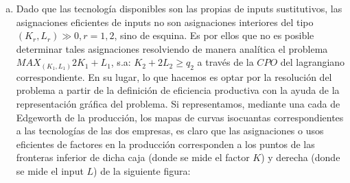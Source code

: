 \begin{enumerate}[a)]
	\item Dado que las tecnología disponibles son las propias de inputs sustitutivos, las asignaciones eficientes de inputs no son asignaciones interiores del tipo $(K_r,L_r) \gg 0, r = 1, 2$, sino de esquina. Es por ellos que no es posible determinar tales asignaciones resolviendo de manera analítica el problema $MAX_{(K_1,L_1)} 2K_1 + L_1$, s.a: $K_2 + 2 L_2 \geq q_2$ a través de la $CPO$ del lagrangiano correspondiente. En su lugar, lo que hacemos es optar por la resolución del problema a partir de la definición de eficiencia productiva con la ayuda de la representación gráfica del problema. Si representamos, mediante una cada de Edgeworth de la producción, los mapas de curvas isocuantas correspondientes a las tecnologías de las dos empresas, es claro que las asignaciones o usos eficientes de factores en la producción corresponden a los puntos de las fronteras inferior de dicha caja (donde se mide el factor $K$) y derecha (donde se mide el input $L$) de la siguiente figura:
			\begin{center}
\end{center}
\end{enumerate}
